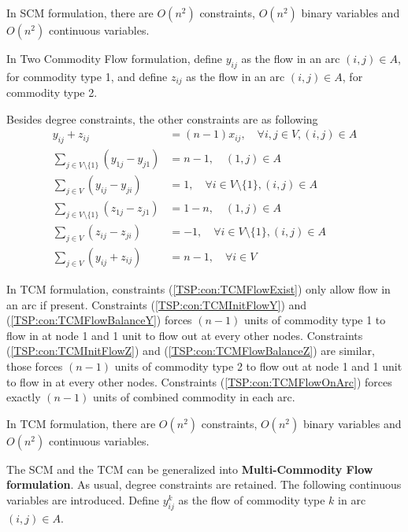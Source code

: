             In SCM formulation, there are $O(n^2)$ constraints, $O(n^2)$ binary variables and $O(n^2)$ continuous variables.

            In Two Commodity Flow formulation, define $y_{ij}$ as the flow in an arc $(i, j) \in A$, for commodity type 1, and define $z_{ij}$ as the flow in an arc $(i, j) \in A$, for commodity type 2.

            Besides degree constraints, the other constraints are as following
            \begin{align}
                y_{ij} + z_{ij} &= (n - 1) x_{ij}, \quad \forall i, j \in V, (i, j) \in A \label{TSP:con:TCMFlowExist} \\
                \sum_{j \in V \setminus \{1\}} (y_{1j} - y_{j1}) &= n - 1, \quad (1, j) \in A \label{TSP:con:TCMInitFlowY}\\
                \sum_{j \in V} (y_{ij} - y_{ji}) & = 1, \quad  \forall i \in V \setminus \{1\}, (i, j) \in A \label{TSP:con:TCMFlowBalanceY}\\
                \sum_{j \in V \setminus \{1\}} (z_{1j} - z_{j1}) &= 1 - n, \quad (1, j) \in A \label{TSP:con:TCMInitFlowZ}\\
                \sum_{j \in V} (z_{ij} - z_{ji}) & = -1, \quad  \forall i \in V \setminus \{1\}, (i, j) \in A \label{TSP:con:TCMFlowBalanceZ}\\
                \sum_{j \in V} (y_{ij} + z_{ij}) &= n - 1, \quad \forall i \in V \label{TSP:con:TCMFlowOnArc}
            \end{align}

            In TCM formulation, constraints (\ref{TSP:con:TCMFlowExist}) only allow flow in an arc if present. Constraints (\ref{TSP:con:TCMInitFlowY}) and (\ref{TSP:con:TCMFlowBalanceY}) forces $(n - 1)$ units of commodity type 1 to flow in at node 1 and 1 unit to flow out at every other nodes. Constraints (\ref{TSP:con:TCMInitFlowZ}) and (\ref{TSP:con:TCMFlowBalanceZ}) are similar, those forces $(n - 1)$ units of commodity type 2 to flow out at node 1 and 1 unit to flow in at every other nodes. Constraints (\ref{TSP:con:TCMFlowOnArc}) forces exactly $(n - 1)$ units of combined commodity in each arc.

            In TCM formulation, there are $O(n^2)$ constraints, $O(n^2)$ binary variables and $O(n^2)$ continuous variables.

            The SCM and the TCM can be generalized into \textbf{Multi-Commodity Flow formulation}. As usual, degree constraints are retained. The following continuous variables are introduced. Define $y_{ij}^k$ as the flow of commodity type $k$ in arc $(i, j) \in A$.


